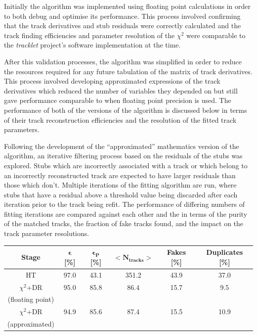 Initially the algorithm was implemented using floating point calculations in order to both debug and optimise its performance.
This process involved confirming that the track derivatives and stub residuals were correctly calculated and the track finding efficiencies and parameter resolution of the $\chi^{2}$ were comparable to the \emph{tracklet} project's software implementation at the time.

After this validation processes, the algorithm was simplified in order to reduce the resources required for any future tabulation of the matrix of track derivatives.
This process involved developing approximated expressions of the track derivatives which reduced the number of variables they depended on but still gave performance comparable to when floating point precision is used.
The performance of both of the versions of the algorithm is discussed below in terms of their track reconstruction efficiencies and the resolution of the fitted track parameters.

Following the development of the ``approximated'' mathematics version of the algorithm, an iterative filtering process based on the residuals of the stubs was explored.
Stubs which are incorrectly associated with a track or which belong to an incorrectly reconstructed track are expected to have larger residuals than those which don't.
Multiple iterations of the fitting algorithm are run, where stubs that have a residual above a threshold value being discarded after each iteration prior to the track being refit.
The performance of differing numbers of fitting iterations are compared against each other and the \KF in terms of the purity of the matched tracks, the fraction of fake tracks found, and the impact on the track parameter resolutions.


\begin{table}[htbp]

\label{tab:chi2-exactVsApprox}
 \centering
 \begin{tabular}{cccccc}
   \hline
   \bf{Stage} & \bf{$\bm{\epsilon}$ [\%]} & \bf{$\bm{\epsilon_{P}}$ [\%]} & $\bm{<N_{tracks}>}$ & \bf{Fakes [\%]} & \bf{Duplicates [\%]}  \\
        \hline
   HT &  97.0 & 43.1 & 351.2 & 43.9 & 37.0 \\  
   \hline
   $\chi^{2}$+DR & 95.0 & 85.8 & 86.4 & 15.7 & 9.5 \\
   (floating point) & & & & & \\
   \hline
   $\chi^{2}$+DR & 94.9 & 85.6 & 87.4 & 15.5 & 10.9 \\  
   (approximated) & & & & & \\   
   \hline
   
 \end{tabular}%
\end{table}

